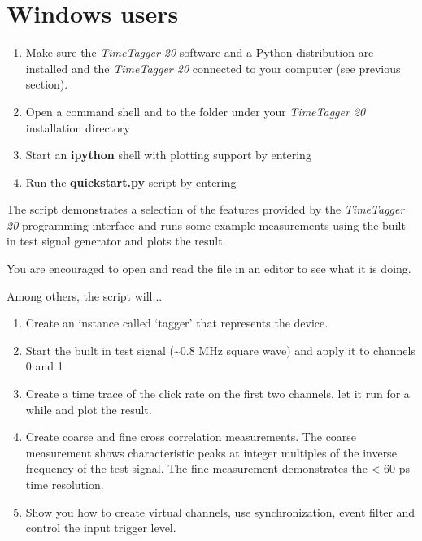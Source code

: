 \documentclass[letterpaper,10pt,english]{sphinxmanual}
\begin{document}
\section{Windows users}
\label{sections/gettingStarted:windows-users}\begin{enumerate}
\item {} 
Make sure the \emph{TimeTagger 20} software and a Python distribution are installed and the \emph{TimeTagger 20} connected to your computer (see previous section).

\item {} 
Open a command shell and  to the  folder under your \emph{TimeTagger 20} installation directory

\item {} 
Start an \textbf{ipython} shell with plotting support by entering 

\item {} 
Run the \textbf{quickstart.py} script by entering 

\end{enumerate}

The script demonstrates a selection of the features provided by the \emph{TimeTagger 20} programming interface
and runs some example measurements using the built in test signal generator and plots the result.

You are encouraged to open and read the  file in an editor to see what it is doing.

Among others, the script will...
\begin{enumerate}
\item {} 
Create an instance called `tagger' that represents the device.

\item {} 
Start the built in test signal (\textasciitilde{}0.8 MHz square wave) and apply it to channels 0 and 1

\item {} 
Create a time trace of the click rate on the first two channels, let it run for a while and plot the result.

\item {} 
Create coarse and fine cross correlation measurements. The coarse measurement shows characteristic peaks at integer multiples of the inverse frequency of the test signal. The fine measurement demonstrates the \textless{} 60 ps time resolution.

\item {} 
Show you how to create virtual channels, use synchronization, event filter and control the input trigger level.

\end{enumerate}
\end{document}
